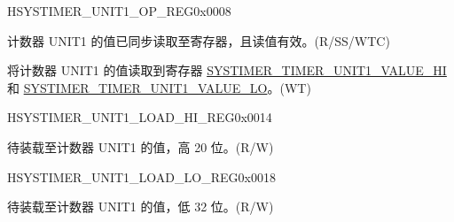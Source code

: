 \begin{register}{H}{SYSTIMER\_UNIT1\_OP\_REG}{0x0008}\label{regdesc:SYSTIMERUNIT1OPREG}
%
%
%
%
\regnewline%
\begin{regdesc}\begin{reglist}
\label{fielddesc:SYSTIMERTIMERUNIT1VALUEVALID}\item [SYSTIMER\_TIMER\_UNIT1\_VALUE\_VALID] 计数器 UNIT1 的值已同步读取至寄存器，且读值有效。(R/SS/WTC)
\label{fielddesc:SYSTIMERTIMERUNIT1UPDATE}\item [SYSTIMER\_TIMER\_UNIT1\_UPDATE] 将计数器 UNIT1 的值读取到寄存器 \hyperref[fielddesc:SYSTIMERTIMERUNIT1VALUEHI]{SYSTIMER\_TIMER\_UNIT1\_VALUE\_HI} 和 \hyperref[fielddesc:SYSTIMERTIMERUNIT1VALUELO]{SYSTIMER\_TIMER\_UNIT1\_VALUE\_LO}。(WT)
\end{reglist}\end{regdesc}
\end{register}


\begin{register}{H}{SYSTIMER\_UNIT1\_LOAD\_HI\_REG}{0x0014}\label{regdesc:SYSTIMERUNIT1LOADHIREG}
%
%
\regnewline%
\begin{regdesc}\begin{reglist}
\label{fielddesc:SYSTIMERTIMERUNIT1LOADHI}\item [SYSTIMER\_TIMER\_UNIT1\_LOAD\_HI] 待装载至计数器 UNIT1 的值，高 20 位。(R/W)
\end{reglist}\end{regdesc}
\end{register}


\begin{register}{H}{SYSTIMER\_UNIT1\_LOAD\_LO\_REG}{0x0018}\label{regdesc:SYSTIMERUNIT1LOADLOREG}
%
\regnewline%
\begin{regdesc}\begin{reglist}
\label{fielddesc:SYSTIMERTIMERUNIT1LOADLO}\item [SYSTIMER\_TIMER\_UNIT1\_LOAD\_LO] 待装载至计数器 UNIT1 的值，低 32 位。(R/W)
\end{reglist}\end{regdesc}
\end{register}


